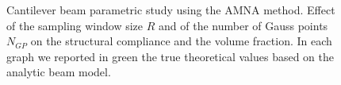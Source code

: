 \begin{figure}
    \quad
    \caption{Cantilever beam parametric study using the AMNA method. Effect of the sampling window size $R$ and of the number of Gauss points $N_{GP}$ on the structural compliance and the volume fraction. In each graph we reported in green the true theoretical values based on the analytic beam model.}%
    \label{fig:cbMNA}%
\end{figure}
\clearpage
